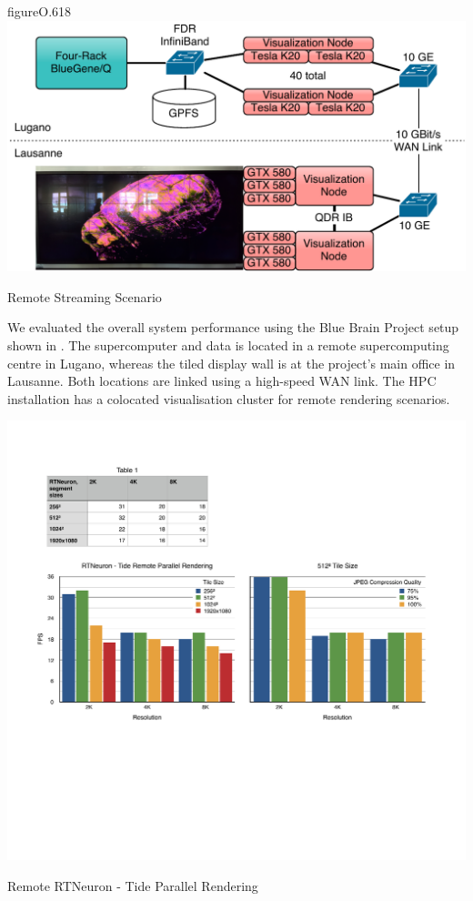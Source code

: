 \begin{wrapfloat}{figure}{O}{.618\textwidth}
  \includegraphics[width=.618\textwidth]{images/tideSetup}
  {\caption{\label{fTideSetup}Remote Streaming Scenario}}
\end{wrapfloat}

We evaluated the overall system performance using the Blue Brain Project setup
shown in . The supercomputer and data is located in a remote
supercomputing centre in Lugano, whereas the tiled display wall is at the
project's main office in Lausanne. Both locations are linked using a high-speed
WAN link. The HPC installation has a colocated visualisation cluster for remote
rendering scenarios.

\begin{benchmark}[h!t]\center
  \includegraphics[width=\columnwidth]{results/tide}
  \caption{\label{rTide}Remote RTNeuron - Tide Parallel Rendering}
\end{benchmark}

